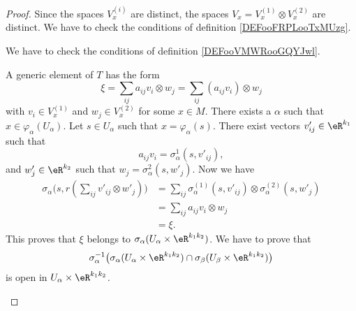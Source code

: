 \begin{proof}
	Since the spaces \( V^{(i)}_x\) are distinct, the spaces \( V_x=V_x^{(1)}\otimes V_x^{(2)}\) are distinct.
	We have to check the conditions of definition \ref{DEFooFRPLooTxMUzg}.
	\begin{subproof}
		We have to check the conditions of definition \ref{DEFooVMWRooGQYJwl}.
		\begin{subproof}
			A generic element of \( T\) has the form
			\begin{equation}
				\xi=\sum_{ij}a_{ij} v_i\otimes w_j=\sum_{ij} (a_{ij}v_i)\otimes w_j
			\end{equation}
			with \( v_i\in V_x^{(1)}\) and \( w_j\in V_x^{(2)}\) for some \( x\in M\). There exists a \( \alpha\) such that \( x\in \varphi_{\alpha}(U_{\alpha})\). Let \( s\in U_{\alpha}\) such that \( x=\varphi_{\alpha}(s)\). There exist vectors \( v'_{ij}\in \eR^{k_1}\) such that
			\begin{equation}
				a_{ij}v_i=\sigma_{\alpha}^{1}(s,v'_{ij}),
			\end{equation}
			and \( w'_j\in \eR^{k_2}\) such that \( w_j=\sigma_{\alpha}^{2}(s,w'_j)\). Now we have
			\begin{subequations}
				\begin{align}
					\sigma_{\alpha}\big( s,r(\sum_{ij}v'_{ij}\otimes w'_j) \big) & =\sum_{ij}\sigma_{\alpha}^{(1)}(s,v'_{ij})\otimes \sigma_{\alpha}^{(2)}(s,w'_j) \\
					                                                             & = \sum_{ij}a_{ij}v_i\otimes w_j                                                 \\
					                                                             & =\xi.
				\end{align}
			\end{subequations}
			This proves that \( \xi\) belongs to \( \sigma_{\alpha}(U_{\alpha}\times \eR^{k_1k_2})\).
			We have to prove that
			\begin{equation}
				\sigma_{\alpha}^{-1}\big( \sigma_{\alpha}(U_{\alpha}\times \eR^{k_1k_2})\cap  \sigma_{\beta}(U_{\beta}\times \eR^{k_1k_2}) \big)
			\end{equation}
			is open in \( U_{\alpha}\times \eR^{k_1k_2}\).


\end{subproof}
\end{subproof}
\end{proof}
